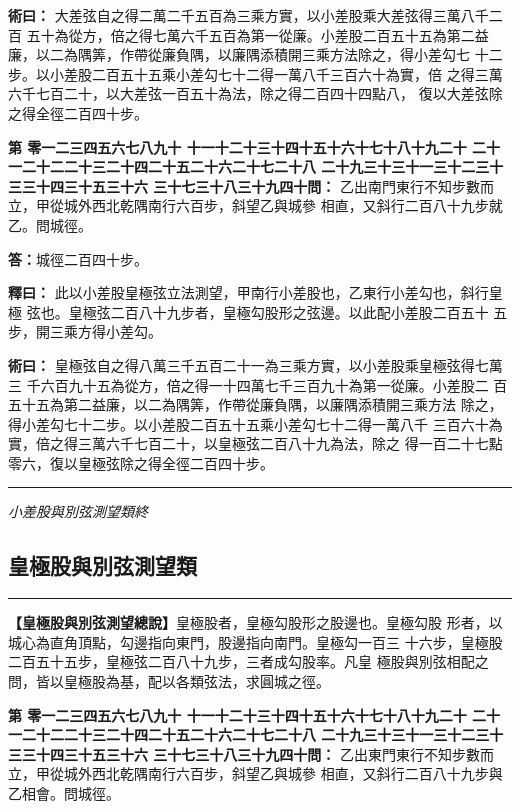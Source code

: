 \documentclass[11pt,a4paper]{article}
\newcommand{\longline}{\noindent\rule{\textwidth}{0.4pt}}
\newcounter{probnum}
\newcommand{\chnum}[1]{%
  \ifcase#1 零\or 一\or 二\or 三\or 四\or 五\or 六\or 七\or 八\or 九\or 十\or
    十一\or 十二\or 十三\or 十四\or 十五\or 十六\or 十七\or 十八\or 十九\or 二十\or
    二十一\or 二十二\or 二十三\or 二十四\or 二十五\or 二十六\or 二十七\or 二十八\or
    二十九\or 三十\or 三十一\or 三十二\or 三十三\or 三十四\or 三十五\or 三十六\or
    三十七\or 三十八\or 三十九\or 四十\fi}
\newcommand{\problem}[1]{\stepcounter{probnum}\par\noindent\textbf{第\chnum{\value{probnum}}問：}#1\par}
\newcommand{\answer}[1]{\par\noindent\textbf{答：}#1\par}
\newcommand{\shiyi}[1]{\par\noindent\textbf{釋曰：}#1\par}
\newcommand{\shuyue}[1]{\par\noindent\textbf{術曰：}#1\par}
\begin{document}
\shuyue{
大差弦自之得二萬二千五百為三乘方實，以小差股乘大差弦得三萬八千二百
五十為從方，倍之得七萬六千五百為第一從廉。小差股二百五十五為第二益
廉，以二為隅筭，作帶從廉負隅，以廉隅添積開三乘方法除之，得小差勾七
十二步。以小差股二百五十五乘小差勾七十二得一萬八千三百六十為實，倍
之得三萬六千七百二十，以大差弦一百五十為法，除之得二百四十四點八，
復以大差弦除之得全徑二百四十步。
}

\vspace{0.3cm}
\problem{
乙出南門東行不知步數而立，甲從城外西北乾隅南行六百步，斜望乙與城參
相直，又斜行二百八十九步就乙。問城徑。
}

\answer{城徑二百四十步。}

\shiyi{
此以小差股皇極弦立法測望，甲南行小差股也，乙東行小差勾也，斜行皇極
弦也。皇極弦二百八十九步者，皇極勾股形之弦邊。以此配小差股二百五十
五步，開三乘方得小差勾。
}

\shuyue{
皇極弦自之得八萬三千五百二十一為三乘方實，以小差股乘皇極弦得七萬三
千六百九十五為從方，倍之得一十四萬七千三百九十為第一從廉。小差股二
百五十五為第二益廉，以二為隅筭，作帶從廉負隅，以廉隅添積開三乘方法
除之，得小差勾七十二步。以小差股二百五十五乘小差勾七十二得一萬八千
三百六十為實，倍之得三萬六千七百二十，以皇極弦二百八十九為法，除之
得一百二十七點零六，復以皇極弦除之得全徑二百四十步。
}

\vspace{0.5cm}
\longline
\begin{center}
\textit{小差股與別弦測望類終}
\end{center}

\newpage
\setcounter{probnum}{0}

\subsection*{皇極股與別弦測望類}
\vspace{0.3cm}
\longline
\vspace{0.3cm}

\noindent
\textbf{【皇極股與別弦測望總說】}皇極股者，皇極勾股形之股邊也。皇極勾股
形者，以城心為直角頂點，勾邊指向東門，股邊指向南門。皇極勾一百三
十六步，皇極股二百五十五步，皇極弦二百八十九步，三者成勾股率。凡皇
極股與別弦相配之問，皆以皇極股為基，配以各類弦法，求圓城之徑。

\problem{
乙出東門東行不知步數而立，甲從城外西北乾隅南行六百步，斜望乙與城參
相直，又斜行二百八十九步與乙相會。問城徑。
}
\end{document}
